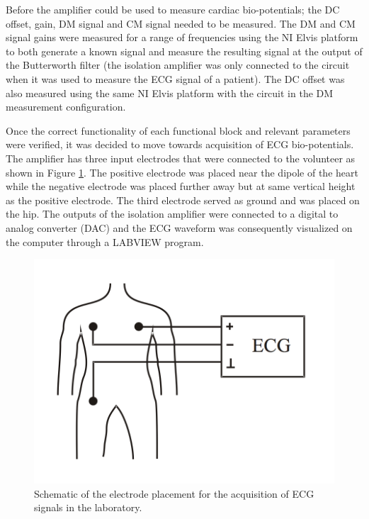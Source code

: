 \documentclass[pdftex,12pt,letterpaper]{article}
\begin{document}
Before the amplifier could be used to measure cardiac bio-potentials; the DC offset, gain, DM signal and CM signal needed to be measured. The DM and CM signal gains were measured for a range of frequencies using the NI Elvis platform to both generate a known signal and measure the resulting signal at the output of the Butterworth filter (the isolation amplifier was only connected to the circuit when it was used to measure the ECG signal of a patient). The DC offset was also measured using the same NI Elvis platform with the circuit in the DM measurement configuration. 
   
Once the correct functionality of each functional block and relevant parameters were verified, it was decided to move towards acquisition of ECG bio-potentials. The amplifier has three input electrodes that were connected to the volunteer as shown in Figure \ref{fig:setup}. The positive electrode was placed near the dipole of the heart while the negative electrode was placed further away but at same vertical height as the positive electrode. The third electrode served as ground and was placed on the hip. The outputs of the isolation amplifier were connected to a digital to analog converter (DAC) and the ECG waveform was consequently visualized on the computer through a LABVIEW program.

\begin{figure}[H]
\begin{center}
\includegraphics[scale=.5]{setup.png}
\caption{Schematic of the electrode placement for the acquisition of ECG signals in the laboratory.}
\label{fig:setup}
\end{center}
\end{figure}
\end{document}
